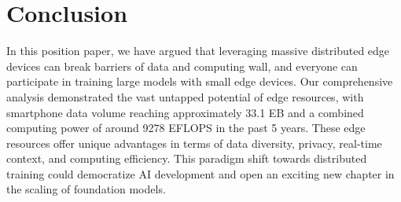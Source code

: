 \section{Conclusion}

In this position paper, we have argued that 
leveraging massive distributed edge devices can break barriers of data and computing wall, and everyone can participate in training large models with small edge devices.
Our comprehensive analysis demonstrated the vast untapped potential of edge resources, with smartphone data volume reaching approximately 33.1 EB and a combined computing power of around 9278 EFLOPS  in the past 5 years. 
These edge resources offer unique advantages in terms of data diversity, privacy, real-time context, and computing efficiency. 
This paradigm shift towards distributed training could democratize AI development and open an exciting new chapter in the scaling of foundation models.


